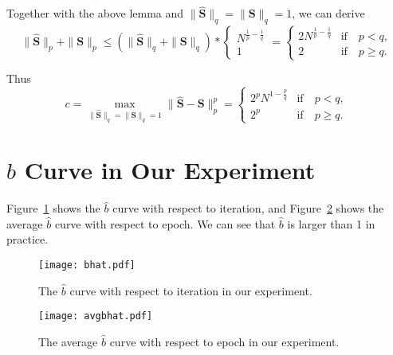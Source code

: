 \documentclass[sigconf]{acmart}
\begin{document}
Together with the above lemma and $\|\hat{\mathbf{S}}\|_q = \|{\mathbf{S}}\|_q=1$, we can derive
\begin{equation}
\|\hat{\mathbf{S}}\|_p + \|{\mathbf{S}}\|_p\le (\|\hat{\mathbf{S}}\|_q + \|{\mathbf{S}}\|_q)*
\begin{cases}
    N^{\frac{1}{p}-\frac{1}{q}} \\
    1 
\end{cases}
=
\begin{cases}
    2N^{\frac{1}{p}-\frac{1}{q}} & \mbox{if}\quad p<q, \\
    2 & \mbox{if}\quad p\ge q.
\end{cases}
\end{equation}

Thus
\begin{equation}
c = \max_{\|\hat{\mathbf{S}}\|_q = \|{\mathbf{S}}\|_q=1}{\|\hat{\mathbf{S}}-{\mathbf{S}}\|_p^p}=
\begin{cases}
    2^pN^{1-\frac{p}{q}} & \mbox{if}\quad p<q, \\
    2^p & \mbox{if}\quad p\ge q.
\end{cases}
\end{equation}

\section{$\hat{b}$ Curve in Our Experiment}
\label{sec:supp_b}
Figure~\ref{fig:bhat} shows the $\hat{b}$ curve with respect to iteration, and Figure~\ref{fig:avg bhat} shows the average $\hat{b}$ curve with respect to epoch. We can see that $\hat{b}$ is larger than 1 in practice.
\begin{figure}[!htb]
    \centering
    \texttt{[image: bhat.pdf]}
    \caption{The $\hat{b}$ curve with respect to iteration in our experiment.}
    \label{fig:bhat}
\end{figure}

\begin{figure}[!htb]
    \centering
    \texttt{[image: avgbhat.pdf]}
    \caption{The average $\hat{b}$ curve with respect to epoch in our experiment.}
    \label{fig:avg bhat}
\end{figure}
\end{document}
